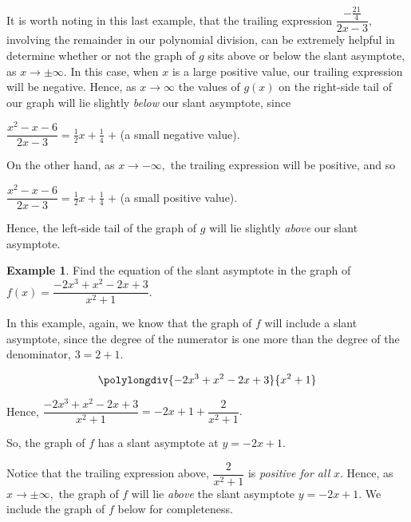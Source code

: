 \documentclass[12pt]{book}
\theoremstyle{definition}
\newtheorem{example}{Example}
\begin{document}
It is worth noting in this last example, that the trailing expression $\dfrac{-\frac{21}{4}}{2x-3},$ involving the remainder in our polynomial division, can be extremely helpful in determine whether or not the graph of $g$ sits above or below the slant asymptote, as $x\rightarrow\pm\infty$.  In this case, when $x$ is a large positive value, our trailing expression will be negative.  Hence, as $x\rightarrow\infty$ the values of $g(x)$ on the right-side tail of our graph will lie slightly {\it below} our slant asymptote, since 
\begin{center}
$\dfrac{x^2-x-6}{2x-3}=\frac{1}{2}x+\frac{1}{4}$ $+$ (a small negative value).
\end{center}
On the other hand, as $x\rightarrow -\infty,$ the trailing expression will be positive, and so
\begin{center}
$\dfrac{x^2-x-6}{2x-3}=\frac{1}{2}x+\frac{1}{4}$ $+$ (a small positive value).
\end{center}
Hence, the left-side tail of the graph of $g$ will lie slightly {\it above} our slant asymptote.
\newpage
\begin{example} Find the equation of the slant asymptote in the graph of $f(x)=\dfrac{-2x^3+x^2-2x+3}{x^2+1}.$
\par
In this example, again, we know that the graph of $f$ will include a slant asymptote, since the degree of the numerator is one more than the degree of the denominator, $3=2+1$.
\begin{multicols}{2}

\[
  \polylongdiv{-2x^3+x^2-2x+3}{x^2+1}
\]

\columnbreak

Hence, $\dfrac{-2x^3+x^2-2x+3}{x^2+1} = -2x+1 + \dfrac{2}{x^2+1}.$
\par
So, the graph of $f$ has a slant asymptote at $y=-2x+1.$
\end{multicols}
Notice that the trailing expression above, $\dfrac{2}{x^2+1}$ is {\it positive for all} $x$.  Hence, as $x\rightarrow\pm\infty,$ the graph of $f$ will lie {\it above} the slant asymptote $y=-2x+1$.  We include the graph of $f$ below for completeness.
\end{example}
\begin{center}
\end{center}
\end{document}
